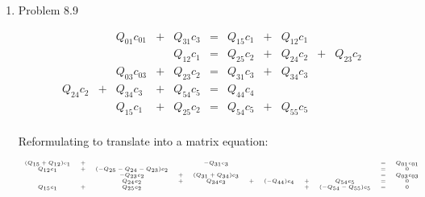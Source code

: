 \documentclass[12pt]{amsart}
\begin{document}
\begin{enumerate}
In order to compute the solution, we use the following code:
\begin{verbatim}
A = [0,-6,5; 0, 2, 7; -4, 3, -7];
b = [50, -30, 50]';
x = A\b
\end{verbatim}
Furthermore, we can compute the transpose and inverse of the
coefficient matrix using the commands {\tt A', inv(A)}.

The outputs are $x = (-17.0192,-9.6154,-1.5385)^T$.
\[A^T = \left(
\begin{array}{ccc}
0 & 0  & -4 \\
-6 & 2 & 3 \\
5 & 7 & -7
\end{array}
\right), \hspace{1cm}
A^{-1} = \left(
\begin{array}{ccc}
-0.1683 & -0.1298  & -0.2500 \\
-0.1346 & 0.0962 & 0 \\
0.0385 & 0.1154 & 0
\end{array}
\right)
\]


\vfill
\pagebreak

\item Problem 8.9

\[
\begin{array}{ccccccccccccc}
& & Q_{01}c_{01} & + & Q_{31} c_3 & = & Q_{15} c_1 & + & Q_{12} c_1 &  & \\
& & & & Q_{12} c_1 & = & Q_{25} c_2 & + & Q_{24} c_2 & + & Q_{23} c_2 \\
& & Q_{03} c_{03} & + & Q_{23} c_2 & = & Q_{31} c_3 & + & Q_{34} c_3 \\
Q_{24} c_2 & + & Q_{34} c_3 & + & Q_{54} c_5 & = & Q_{44} c_4 \\
& & Q_{15} c_1 & + & Q_{25} c_2 & = & Q_{54} c_5 & + & Q_{55} c_5 \\
\end{array}
\]

Reformulating to translate into a matrix equation:

\[ {\tiny
\begin{array}{ccccccccccccc}
(Q_{15} + Q_{12}) c_1  & +  & & &  - Q_{31}c_{3} &  & & & &  = &  Q_{01} c_{01}\\
Q_{12} c_1 & + & (-Q_{25} - Q_{24} - Q_{23})c_2 & & & & & & & = & 0 \\
 &  & - Q_{23}c_2 & + & (Q_{31} + Q_{34})c_3 & & & & &  = &  Q_{03} c_{03} \\
& & Q_{24} c_2 & + & Q_{34} c_3 & + & (- Q_{44})c_4 & + & Q_{54} c_5 & = & 0 \\
Q_{15} c_1 & + & Q_{25} c_2 & & & & & + & (-Q_{54} - Q_{55}) c_5 & = & 0\\
\end{array}}
\]


\end{enumerate}
\end{document}
